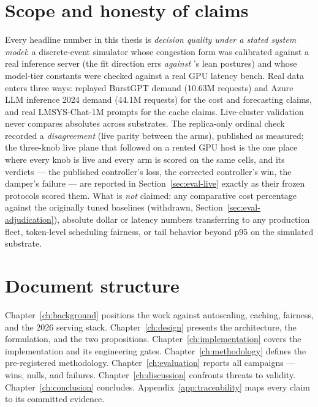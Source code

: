 \section{Scope and honesty of claims}
\label{sec:intro-scope}

Every headline number in this thesis is \emph{decision quality under a stated
system model}: a discrete-event simulator whose congestion form was
calibrated against a real inference server (the fit direction errs
\emph{against} \polyforge{}'s lean postures) and whose model-tier constants
were checked against a real GPU latency bench. Real data enters three ways:
replayed BurstGPT demand (10.63M requests) and Azure LLM inference 2024
demand (44.1M requests) for the cost and forecasting claims, and real
LMSYS-Chat-1M prompts for the cache claims. Live-cluster validation never
compares absolutes across substrates. The replica-only ordinal check
recorded a \emph{disagreement} (live parity between the arms), published as
measured; the three-knob live plane that followed on a rented GPU host is
the one place where every knob is live and every arm is scored on the same
cells, and its verdicts --- the published controller's loss, the corrected
controller's win, the damper's failure --- are reported in
Section~\ref{sec:eval-live} exactly as their frozen protocols scored them.
What is \emph{not} claimed: any comparative cost percentage against the
originally tuned baselines (withdrawn, Section~\ref{sec:eval-adjudication}),
absolute dollar or latency numbers transferring to any production fleet,
token-level scheduling fairness, or tail behavior beyond p95 on the
simulated substrate.

\section{Document structure}

Chapter~\ref{ch:background} positions the work against autoscaling, caching,
fairness, and the 2026 serving stack. Chapter~\ref{ch:design} presents the
architecture, the \jcac{} formulation, and the two propositions.
Chapter~\ref{ch:implementation} covers the implementation and its
engineering gates. Chapter~\ref{ch:methodology} defines the pre-registered
methodology. Chapter~\ref{ch:evaluation} reports all campaigns ---
wins, nulls, and failures. Chapter~\ref{ch:discussion} confronts threats to
validity. Chapter~\ref{ch:conclusion} concludes.
Appendix~\ref{app:traceability} maps every claim to its committed evidence.
